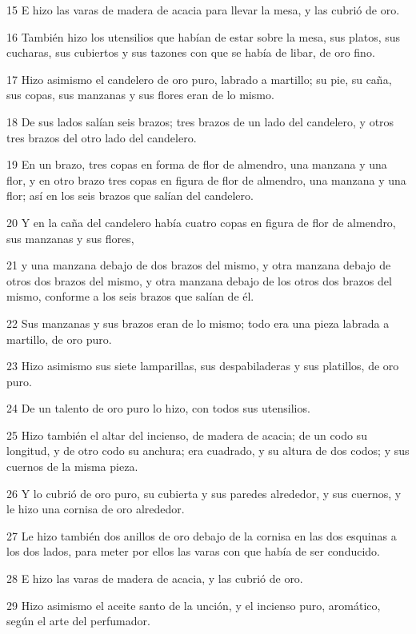 \par 15 E hizo las varas de madera de acacia para llevar la mesa, y las cubrió de oro.
\par 16 También hizo los utensilios que habían de estar sobre la mesa, sus platos, sus cucharas, sus cubiertos y sus tazones con que se había de libar, de oro fino.
\par 17 Hizo asimismo el candelero de oro puro, labrado a martillo; su pie, su caña, sus copas, sus manzanas y sus flores eran de lo mismo.
\par 18 De sus lados salían seis brazos; tres brazos de un lado del candelero, y otros tres brazos del otro lado del candelero.
\par 19 En un brazo, tres copas en forma de flor de almendro, una manzana y una flor, y en otro brazo tres copas en figura de flor de almendro, una manzana y una flor; así en los seis brazos que salían del candelero.
\par 20 Y en la caña del candelero había cuatro copas en figura de flor de almendro, sus manzanas y sus flores,
\par 21 y una manzana debajo de dos brazos del mismo, y otra manzana debajo de otros dos brazos del mismo, y otra manzana debajo de los otros dos brazos del mismo, conforme a los seis brazos que salían de él.
\par 22 Sus manzanas y sus brazos eran de lo mismo; todo era una pieza labrada a martillo, de oro puro.
\par 23 Hizo asimismo sus siete lamparillas, sus despabiladeras y sus platillos, de oro puro.
\par 24 De un talento de oro   puro lo hizo, con todos sus utensilios.
\par 25 Hizo también el altar del incienso, de madera de acacia; de un codo su longitud, y de otro codo su anchura; era cuadrado, y su altura de dos codos; y sus cuernos de la misma pieza.
\par 26 Y lo cubrió de oro puro, su cubierta y sus paredes alrededor, y sus cuernos, y le hizo una cornisa de oro alrededor.
\par 27 Le hizo también dos anillos de oro debajo de la cornisa en las dos esquinas a los dos lados, para meter por ellos las varas con que había de ser conducido.
\par 28 E hizo las varas de madera de acacia, y las cubrió de oro.
\par 29 Hizo asimismo el aceite santo de la unción, y el incienso puro, aromático, según el arte del perfumador.

